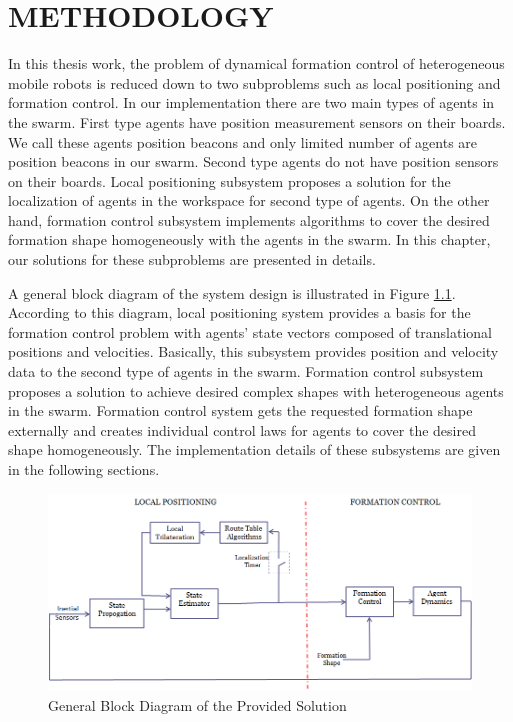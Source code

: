 

\chapter{METHODOLOGY}
\label{chp:Methodology}








In this thesis work, the problem of dynamical formation control of heterogeneous mobile robots is reduced down to two subproblems such as local positioning and formation control.  In our implementation there are two main types of agents in the swarm. First type agents have position measurement sensors on their boards. We call these agents position beacons and only limited number of agents are position beacons in our swarm. Second type agents do not have position sensors on their boards. Local positioning subsystem proposes a solution for the localization of agents in the workspace for second type of agents. On the other hand, formation control subsystem implements algorithms to cover the desired formation shape homogeneously with the agents in the swarm. In this chapter, our solutions for these subproblems are presented in details.

A general block diagram of the system design is illustrated in Figure \ref{general_system}. According to this diagram, local positioning system provides a basis for the formation control problem with agents' state vectors composed of translational positions and velocities. Basically, this subsystem provides position and velocity data to the second type of agents in the swarm. Formation control subsystem proposes a solution to achieve desired complex shapes with heterogeneous agents in the swarm. Formation control system gets the requested formation shape externally and creates individual control laws for agents to cover the desired shape homogeneously. The implementation details of these subsystems are given in the following sections. 
\begin{figure}[H]
\caption{General Block Diagram of the Provided Solution} \label{general_system}
\centering
\includegraphics[scale = 0.58]{general_scheme}
\end{figure}

